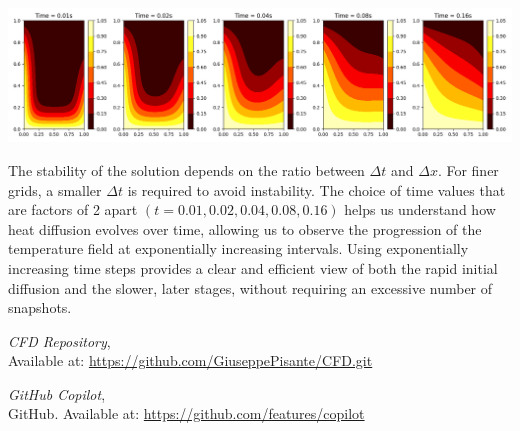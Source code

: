\documentclass{article}
\begin{document}
\includegraphics[width=\textwidth]{Figure_4.png}\par\vspace{1cm}

The stability of the solution depends on the ratio between \( \Delta t \) and \( \Delta x \). For finer grids, a smaller \( \Delta t \) 
is required to avoid instability. The choice of time values that are factors of 2 apart \( (t = 0.01, 0.02, 0.04, 0.08, 0.16) \) helps us
understand how heat diffusion evolves over time, allowing us to observe the progression of the temperature field at exponentially increasing 
intervals. Using exponentially increasing time steps provides a clear and efficient view of both the rapid initial diffusion and the slower, 
later stages, without requiring an excessive number of snapshots.


\begin{thebibliography}{9}
    \textit{CFD Repository},\\
    Available at: \url{https://github.com/GiuseppePisante/CFD.git}
    
    \textit{GitHub Copilot},\\
    GitHub. Available at: \url{https://github.com/features/copilot}
    \end{thebibliography}
\end{document}
